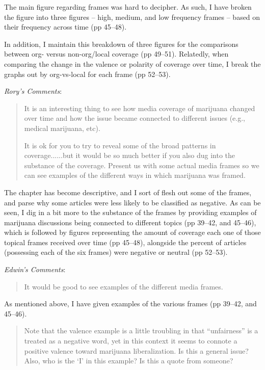 \documentclass[12pt,stdletter,dateno,sigleft]{newlfm} %
\begin{document}
\begin{newlfm}
The main figure regarding frames was hard to decipher. As such, I have broken the figure into three figures -- high, medium, and low frequency frames -- based on their frequency across time (pp 45--48). 

In addition, I maintain this breakdown of three figures for the comparisons between org- versus non-org/local coverage (pp 49--51). Relatedly, when comparing the change in the valence or polarity of coverage over time, I break the graphs out by org-vs-local for each frame (pp 52--53).\newline


\textit{Rory's Comments}:

\begin{quotation}{\color{red}\noindent \footnotesize
It is an interesting thing to see how media coverage of marijuana changed over time and how the issue became connected to different issues (e.g., medical marijuana, etc). \newline

\noindent It is ok for you to try to reveal some of the broad patterns in coverage......but it would be so much better if you also dug into the substance of the coverage.  Present us with some actual media frames so we can see examples of the different ways in which marijuana was framed.
}
\end{quotation}




The chapter has become descriptive, and I sort of flesh out some of the frames, and parse why some articles were less likely to be classified as negative.  As can be seen, I dig in a bit more to the substance of the frames by providing examples of marijuana discussions being connected to different topics (pp 39--42, and 45--46), which is followed by figures representing the amount of coverage each one of those topical frames received over time (pp 45--48), alongside the percent of articles (possessing each of the six frames) were negative or neutral (pp 52--53). \newline

\textit{Edwin's Comments}:


\begin{quotation}{\color{red}\noindent \footnotesize
It would be good to see examples of the different media frames. 
}
\end{quotation}


As mentioned above, I have given examples of the various frames (pp 39--42, and 45--46). 


\begin{quotation}{\color{red}\noindent \footnotesize
Note that the valence example is a little troubling in that ``unfairness'' is a treated as a negative word, yet in this context it seems to connote a positive valence toward marijuana liberalization.  Is this a general issue? Also, who is the `I' in this example? Is this a quote from someone?
}
\end{quotation}




\end{newlfm}
\end{document}
